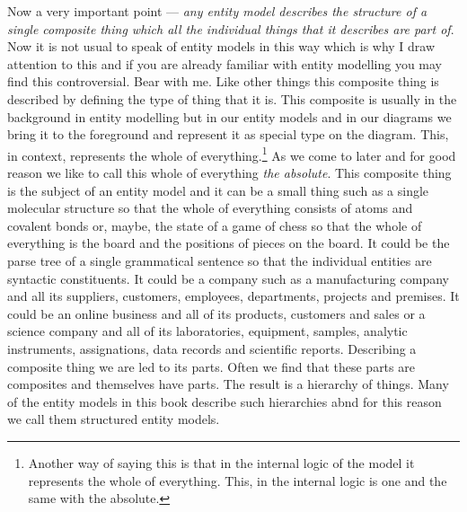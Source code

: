 \mynote
Now a very  important point ---
\textit{any entity model describes the structure of a single composite thing which all the individual things that it describes are part of}. Now it is not usual to speak of entity models in this way which is why I draw attention to this and if you are already familiar with entity modelling you may find this controversial. Bear with me.
\mynote
Like other things this composite thing is described by defining the type of thing that it is. This composite is usually in the background in entity modelling but in our entity models and in our diagrams we bring it to the foreground and represent it as special type on the diagram. 
This, in context, represents the whole of everything.\footnote{Another way of saying this is that in the internal logic of the model it represents the whole of everything. This, in the internal logic is one and the same with the absolute.} As we come to later and for good reason we like to call this whole of everything \textit{the absolute}.   This composite thing  is the subject of an entity model and it can be a small thing such as a single molecular structure so that the whole of everything consists of atoms and covalent bonds or, maybe, the state of a game of chess so that the whole of everything is the board and the positions of pieces on the board. It could be the parse tree of a single grammatical sentence 
so that the individual entities are syntactic constituents. 
It could be a company such as a manufacturing company and all its suppliers, customers, employees, departments, projects and premises. 
It could be an online business and all of its products, customers and sales or
a science company and all of its laboratories, equipment, samples, analytic instruments, assignations, data records and  scientific reports. 
\mynote
Describing a composite thing we are led to its parts. Often we find that these parts are composites and themselves have parts. The result is a hierarchy of things. Many of the  entity models in this book describe such hierarchies abnd for this reason we call them structured entity models.

